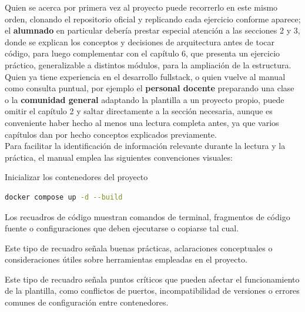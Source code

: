 	Quien se acerca por primera vez al proyecto puede recorrerlo en este mismo orden, clonando el repositorio oficial y replicando cada ejercicio conforme aparece; el \textbf{alumnado} en particular deber\'ia prestar especial atenci\'on a las secciones 2 y 3, donde se explican los conceptos y decisiones de arquitectura antes de tocar c\'odigo, para luego complementar con el cap\'itulo 6, que presenta un ejercicio pr\'actico, generalizable a distintos m\'odulos, para la ampliaci\'on de la estructura. Quien ya tiene experiencia en el desarrollo fullstack, o quien vuelve al manual como consulta puntual, por ejemplo el \textbf{personal docente} preparando una clase o la \textbf{comunidad general} adaptando la plantilla a un proyecto propio, puede omitir el cap\'itulo 2 y saltar directamente a la secci\'on necesaria, aunque es conveniente haber hecho al menos una lectura completa antes, ya que varios cap\'itulos dan por hecho conceptos explicados previamente. \\
	
	Para facilitar la identificaci\'on de informaci\'on relevante durante la lectura y la pr\'actica, el manual emplea las siguientes convenciones visuales:
	
	\begin{codebox}{Inicializar los contenedores del proyecto}
		\begin{lstlisting}[language=bash]
docker compose up -d --build
		\end{lstlisting}
	\end{codebox}
	Los recuadros de código muestran comandos de terminal, fragmentos de código
	fuente o configuraciones que deben ejecutarse o copiarse tal cual.
	
	\begin{notabox}
		Este tipo de recuadro señala buenas pr\'acticas, aclaraciones conceptuales o consideraciones \'utiles sobre herramientas empleadas en el proyecto.
	\end{notabox}
	
	\begin{warnbox}
		Este tipo de recuadro señala puntos cr\'iticos que pueden afectar el funcionamiento de la plantilla, como conflictos de puertos, incompatibilidad de versiones o errores comunes de configuraci\'on entre contenedores.
	\end{warnbox}